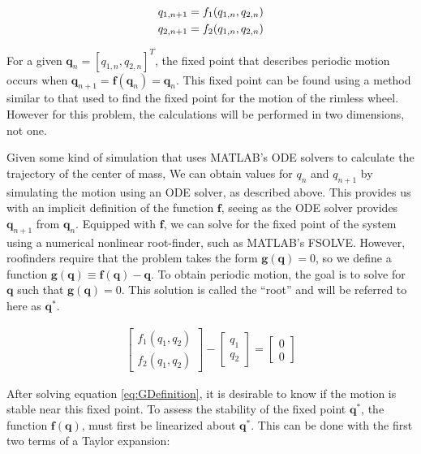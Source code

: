 \begin{align}
q_{1,n+1}= f_{1}(q_{1,n},q_{2,n}) \notag \\
q_{2,n+1}=  f_{2}(q_{1,n},q_{2,n})
\label{eq:FullFunctionDefinition}
\end{align}

For a given $\mathbf{q}_{n}=[q_{1,n},q_{2,n}]^{T}$, the fixed point that
describes periodic motion occurs when
$\mathbf{q}_{n+1}=\mathbf{f}(\mathbf{q}_{n})=\mathbf{q}_{n}$. This fixed point
can be found using a method similar to that used to find the fixed point for
the motion of the rimless wheel. However for this problem, the calculations
will be performed in two dimensions, not one.

Given some kind of simulation that uses MATLAB's ODE solvers to calculate the
trajectory of the center of mass, We can obtain values for $q_{n}$ and
$q_{n+1}$ by simulating the motion using an ODE solver, as described above.
This provides us with an implicit definition of the function $\mathbf{f}$,
seeing as the ODE solver provides $\mathbf{q}_{n+1}$ from $\mathbf{q}_n$.
Equipped with $\mathbf{f}$, we can solve for the fixed point of the system
using a numerical nonlinear root-finder, such as MATLAB's FSOLVE.  However,
roofinders require that the problem takes the form $\mathbf{g}(\mathbf{q})=0$,
so we define a function $\mathbf{g}(\mathbf{q}) \equiv
\mathbf{f}(\mathbf{q})-\mathbf{q}$. To obtain periodic motion, the goal is to
solve for $\mathbf{q}$ such that $\mathbf{g}(\mathbf{q})=0$. This solution is
called the ``root'' and will be referred to here as $\mathbf{q}^{*}$.

 \begin{align}
 \begin{bmatrix}
 f_{1}(q_{1},q_{2}) \\
 f_{2}(q_{1},q_{2})
 \end{bmatrix}
 -
 \begin{bmatrix}
 q_{1} \\
 q_{2}
 \end{bmatrix}
 =
 \begin{bmatrix}
 0 \\
 0
\end{bmatrix}
\label{eq:GDefinition}
\end{align}


After solving equation \ref{eq:GDefinition}, it is desirable to know if the
motion is stable near this fixed point. To assess the stability of the fixed
point $\mathbf{q}^{*}$, the function $\mathbf{f}(\mathbf{q})$, must first be
linearized about $\mathbf{q}^{*}$.  This can be done with the first two terms
of a Taylor expansion:

